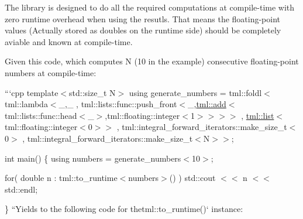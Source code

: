 The library is designed to do all the required computations at compile-\/time with zero runtime overhead when using the resutls. That means the floating-\/point values (Actually stored as {\ttfamily double}s on the runtime side) should be completely aviable and known at compile-\/time.

Given this code, which computes N (10 in the example) consecutive floating-\/point numbers at compile-\/time\+:

```cpp template$<$std\+::size\+\_\+t N$>$ using generate\+\_\+numbers = tml\+::foldl$<$tml\+::lambda$<$\+\_,\+\_ , tml\+::lists\+::func\+::push\+\_\+front$<$\+\_,\hyperlink{structtml_1_1add}{tml\+::add}$<$tml\+::lists\+::func\+::head$<$\+\_$>$,tml\+::floating\+::integer$<$1$>$$>$$>$$>$ , \hyperlink{structtml_1_1list}{tml\+::list}$<$tml\+::floating\+::integer$<$0$>$$>$ , tml\+::integral\+\_\+forward\+\_\+iterators\+::make\+\_\+size\+\_\+t$<$0$>$ , tml\+::integral\+\_\+forward\+\_\+iterators\+::make\+\_\+size\+\_\+t$<$\+N$>$$>$;

int main() \{ using numbers = generate\+\_\+numbers$<$10$>$;

for( double n \+: tml\+::to\+\_\+runtime$<$numbers$>$() ) std\+::cout $<$$<$ n $<$$<$ std\+::endl;

\} ``{\ttfamily  Yields to the following code for the}tml\+::to\+\_\+runtime()` instance\+:

